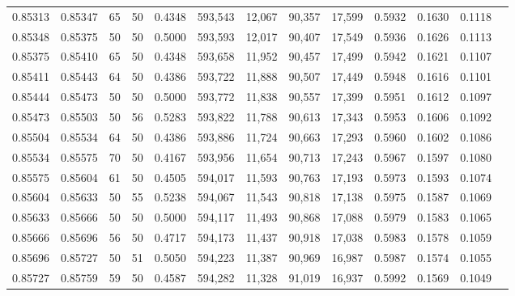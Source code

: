 \begin{tabular}{rrrrrrrrrrrrr}
0.85313 & 0.85347 &    65 &  50 &                                     0.4348 & 593,543 &  12,067 &  90,357 &  17,599 & 0.5932 & 0.1630 & 0.1118 \\
0.85348 & 0.85375 &    50 &  50 &                                     0.5000 & 593,593 &  12,017 &  90,407 &  17,549 & 0.5936 & 0.1626 & 0.1113 \\
0.85375 & 0.85410 &    65 &  50 &                                     0.4348 & 593,658 &  11,952 &  90,457 &  17,499 & 0.5942 & 0.1621 & 0.1107 \\
0.85411 & 0.85443 &    64 &  50 &                                     0.4386 & 593,722 &  11,888 &  90,507 &  17,449 & 0.5948 & 0.1616 & 0.1101 \\
0.85444 & 0.85473 &    50 &  50 &                                     0.5000 & 593,772 &  11,838 &  90,557 &  17,399 & 0.5951 & 0.1612 & 0.1097 \\
0.85473 & 0.85503 &    50 &  56 &                                     0.5283 & 593,822 &  11,788 &  90,613 &  17,343 & 0.5953 & 0.1606 & 0.1092 \\
0.85504 & 0.85534 &    64 &  50 &                                     0.4386 & 593,886 &  11,724 &  90,663 &  17,293 & 0.5960 & 0.1602 & 0.1086 \\
0.85534 & 0.85575 &    70 &  50 &                                     0.4167 & 593,956 &  11,654 &  90,713 &  17,243 & 0.5967 & 0.1597 & 0.1080 \\
0.85575 & 0.85604 &    61 &  50 &                                     0.4505 & 594,017 &  11,593 &  90,763 &  17,193 & 0.5973 & 0.1593 & 0.1074 \\
0.85604 & 0.85633 &    50 &  55 &                                     0.5238 & 594,067 &  11,543 &  90,818 &  17,138 & 0.5975 & 0.1587 & 0.1069 \\
0.85633 & 0.85666 &    50 &  50 &                                     0.5000 & 594,117 &  11,493 &  90,868 &  17,088 & 0.5979 & 0.1583 & 0.1065 \\
0.85666 & 0.85696 &    56 &  50 &                                     0.4717 & 594,173 &  11,437 &  90,918 &  17,038 & 0.5983 & 0.1578 & 0.1059 \\
0.85696 & 0.85727 &    50 &  51 &                                     0.5050 & 594,223 &  11,387 &  90,969 &  16,987 & 0.5987 & 0.1574 & 0.1055 \\
0.85727 & 0.85759 &    59 &  50 &                                     0.4587 & 594,282 &  11,328 &  91,019 &  16,937 & 0.5992 & 0.1569 & 0.1049 \\

\end{tabular}

